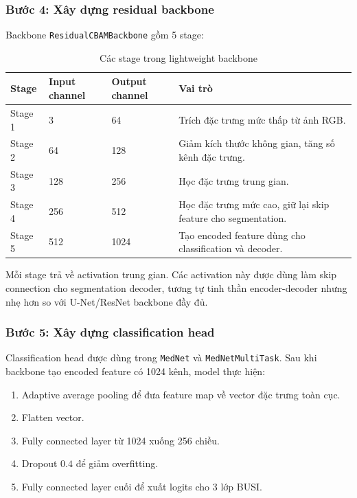 \documentclass[12pt,a4paper]{article}
\begin{document}
\subsubsection*{Bước 4: Xây dựng residual backbone}

Backbone \texttt{ResidualCBAMBackbone} gồm 5 stage:

\begin{table}[H]
\centering
\caption{Các stage trong lightweight backbone}
\renewcommand{\arraystretch}{1.25}
\begin{tabular}{p{2.2cm} p{3.2cm} p{3cm} p{6cm}}
\toprule
\textbf{Stage} & \textbf{Input channel} & \textbf{Output channel} & \textbf{Vai trò} \\
\midrule
Stage 1 & 3 & 64 & Trích đặc trưng mức thấp từ ảnh RGB. \\
Stage 2 & 64 & 128 & Giảm kích thước không gian, tăng số kênh đặc trưng. \\
Stage 3 & 128 & 256 & Học đặc trưng trung gian. \\
Stage 4 & 256 & 512 & Học đặc trưng mức cao, giữ lại skip feature cho segmentation. \\
Stage 5 & 512 & 1024 & Tạo encoded feature dùng cho classification và decoder. \\
\bottomrule
\end{tabular}
\end{table}

Mỗi stage trả về activation trung gian. Các activation này được dùng làm skip connection cho segmentation decoder, tương tự tinh thần encoder-decoder nhưng nhẹ hơn so với U-Net/ResNet backbone đầy đủ.

\subsubsection*{Bước 5: Xây dựng classification head}

Classification head được dùng trong \texttt{MedNet} và \texttt{MedNetMultiTask}. Sau khi backbone tạo encoded feature có 1024 kênh, model thực hiện:

\begin{enumerate}
    \item Adaptive average pooling để đưa feature map về vector đặc trưng toàn cục.
    \item Flatten vector.
    \item Fully connected layer từ 1024 xuống 256 chiều.
    \item Dropout \(0.4\) để giảm overfitting.
    \item Fully connected layer cuối để xuất logits cho 3 lớp BUSI.
\end{enumerate}
\end{document}
